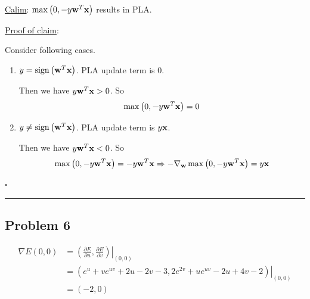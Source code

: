 \documentclass[12pt]{article}
\newcommand*{\QEDB}{\hfill\ensuremath{\square}}
\newcommand{\ParTh}[1]{\left(#1\right)}
\newcommand{\BF}[1]{{\bf#1}}
\newcommand{\horrule}[1]{\rule{\linewidth}{#1}}
\begin{document}
\underline{Calim}: $\max\ParTh{0, -y\BF{w}^T\BF{x}}$ results in PLA.

\underline{Proof of claim}:

Consider following cases.
\begin{enumerate}
	\item $y = \text{sign}\ParTh{\BF{w}^T\BF{x}}$. PLA update term is 0.
	
	Then we have $y\BF{w}^T\BF{x} > 0$. So
	\begin{align}
	\max\ParTh{0, -y\BF{w}^T\BF{x}}=0
	\end{align}
	\item $y \neq \text{sign}\ParTh{\BF{w}^T\BF{x}}$. PLA update term is $y\BF{x}$.
	
	Then we have $y\BF{w}^T\BF{x} < 0$. So
	\begin{align}
	\max\ParTh{0, -y\BF{w}^T\BF{x}}=-y\BF{w}^T\BF{x}\Rightarrow-\nabla_{\BF{w}}\max\ParTh{0, -y\BF{w}^T\BF{x}}=y\BF{x}
	\end{align}
\end{enumerate}

\QEDB

\horrule{0.5pt}

\subsection*{Problem 6}

\begin{align}
\nabla E(0,0) &= \left.\ParTh{\frac{\partial E}{\partial u},\frac{\partial E}{\partial v}}\right|_{\ParTh{0,0}}\\
&= \left.\ParTh{e^{u}+ve^{uv}+2u-2v-3,2e^{2v}+ue^{uv}-2u+4v-2}\right|_{\ParTh{0,0}}\\
&=\ParTh{-2,0}
\end{align}
\end{document}

